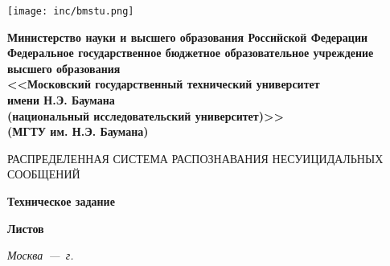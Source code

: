 \begin{titlepage}
	\noindent\begin{minipage}{0.05\textwidth}
		\texttt{[image: inc/bmstu.png]}
	\end{minipage}
	\hfill
	\begin{minipage}{0.85\textwidth}\raggedleft
		\begin{center}
			\fontsize{12pt}{0.3\baselineskip}\selectfont \textbf{Министерство науки и высшего образования Российской Федерации \\ Федеральное государственное бюджетное образовательное учреждение \\ высшего образования \\ <<Московский государственный технический университет \\ имени Н.Э. Баумана \\ (национальный исследовательский университет)>> \\ (МГТУ им. Н.Э. Баумана)}
		\end{center}
	\end{minipage}

	\begin{center}
		\fontsize{12pt}{0.1\baselineskip}\selectfont
		\noindent\makebox[\linewidth]{\rule{\textwidth}{4pt}} \makebox[\linewidth]{\rule{\textwidth}{1pt}}
	\end{center}

	\begin{center}
		\fontsize{18pt}{0.6cm}\selectfont 
		
		РАСПРЕДЕЛЕННАЯ СИСТЕМА РАСПОЗНАВАНИЯ НЕСУИЦИДАЛЬНЫХ СООБЩЕНИЙ
		
	\end{center}
	
	\begin{center}
		\fontsize{14pt}{0.6cm}\selectfont
		
		\textbf{Техническое задание}
		
		\textbf{Листов \pageref{LastPage}}
		
	\end{center}

	\vfill

	\begin{center}
		\normalsize \textit{Москва~---~\the\year г.}
	\end{center}
\end{titlepage}